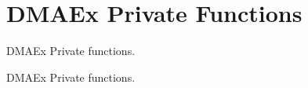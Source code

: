 \hypertarget{group___d_m_a_ex___private___functions}{}\section{D\+M\+A\+Ex Private Functions}
\label{group___d_m_a_ex___private___functions}


D\+M\+A\+Ex Private functions.  


D\+M\+A\+Ex Private functions. 

